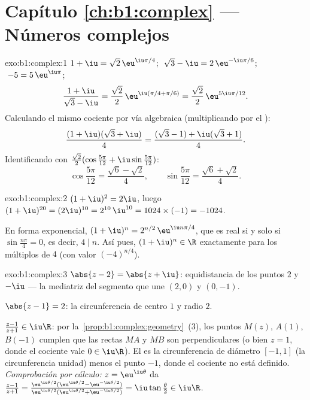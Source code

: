 \section*{Capítulo \ref{ch:b1:complex} --- Números complejos}

\begin{solution}{exo:b1:complex:1}
$1 + \iu = \sqrt 2\, \eu^{\iu\pi/4}$;
$\;\sqrt 3 - \iu = 2\, \eu^{-\iu\pi/6}$;
$\;-5 = 5\, \eu^{\iu\pi}$;
\[
\frac{1 + \iu}{\sqrt 3 - \iu}
= \frac{\sqrt 2}{2}\, \eu^{\iu(\pi/4 + \pi/6)}
= \frac{\sqrt 2}{2}\, \eu^{5\iu\pi/12}.
\]
Calculando el mismo cociente por vía algebraica (multiplicando por el ):
\[
\frac{(1 + \iu)(\sqrt 3 + \iu)}{4}
= \frac{(\sqrt 3 - 1) + \iu(\sqrt 3 + 1)}{4}.
\]
Identificando con $\frac{\sqrt 2}{2}(\cos\frac{5\pi}{12} +
\iu\sin\frac{5\pi}{12})$:
\[
\cos\frac{5\pi}{12} = \frac{\sqrt 6 - \sqrt 2}{4},
\qquad
\sin\frac{5\pi}{12} = \frac{\sqrt 6 + \sqrt 2}{4}.
\]
\end{solution}

\begin{solution}{exo:b1:complex:2}
$(1+\iu)^2 = 2\iu$, luego $(1+\iu)^{20} = (2\iu)^{10} = 2^{10}\,\iu^{10}
= 1024 \times (-1) = -1024$.

En forma exponencial, $(1+\iu)^n = 2^{n/2}\, \eu^{\iu n\pi/4}$, que es
real si y solo si $\sin\frac{n\pi}{4} = 0$, es decir, $4 \mid n$. Así
pues, $(1+\iu)^n \in \R$ exactamente para los múltiplos de $4$ (con
valor $(-4)^{n/4}$).
\end{solution}

\begin{solution}{exo:b1:complex:3}
$\abs{z - 2} = \abs{z + \iu}$: equidistancia de los puntos $2$ y $-\iu$
--- la mediatriz del segmento que une $(2, 0)$ y $(0, -1)$.

$\abs{z - 1} = 2$: la circunferencia de centro $1$ y radio $2$.

$\frac{z-1}{z+1} \in \iu\R$: por la~\cref{prop:b1:complex:geometry}~(3),
los puntos $M(z)$, $A(1)$, $B(-1)$ cumplen que las rectas $MA$ y $MB$
son perpendiculares (o bien $z = 1$, donde el cociente vale
$0 \in \iu\R$). El  es la circunferencia de diámetro
$[-1, 1]$ (la circunferencia unidad) menos el punto $-1$, donde el
cociente no está definido. \emph{Comprobación por cálculo:}
$z = \eu^{\iu\theta}$ da $\frac{z-1}{z+1} =
\frac{\eu^{\iu\theta/2}(\eu^{\iu\theta/2} -
\eu^{-\iu\theta/2})}{\eu^{\iu\theta/2}(\eu^{\iu\theta/2} +
\eu^{-\iu\theta/2})} = \iu\tan\frac\theta2 \in \iu\R$.
\end{solution}

